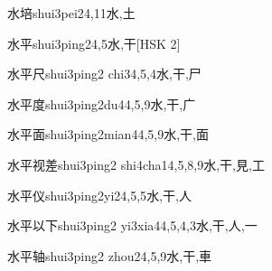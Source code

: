 \begin{EntryWithPhonetic}{水培}{shui3pei2}{4,11}{⽔,⼟}
\end{EntryWithPhonetic}

\begin{EntryWithPhonetic}{水平}{shui3ping2}{4,5}{⽔,⼲}[HSK 2]
\end{EntryWithPhonetic}

\begin{EntryWithPhonetic}{水平尺}{shui3ping2 chi3}{4,5,4}{⽔,⼲,⼫}
\end{EntryWithPhonetic}

\begin{EntryWithPhonetic}{水平度}{shui3ping2du4}{4,5,9}{⽔,⼲,⼴}
\end{EntryWithPhonetic}

\begin{EntryWithPhonetic}{水平面}{shui3ping2mian4}{4,5,9}{⽔,⼲,⾯}
\end{EntryWithPhonetic}

\begin{EntryWithPhonetic}{水平视差}{shui3ping2 shi4cha1}{4,5,8,9}{⽔,⼲,⾒,⼯}
\end{EntryWithPhonetic}

\begin{EntryWithPhonetic}{水平仪}{shui3ping2yi2}{4,5,5}{⽔,⼲,⼈}
\end{EntryWithPhonetic}

\begin{EntryWithPhonetic}{水平以下}{shui3ping2 yi3xia4}{4,5,4,3}{⽔,⼲,⼈,⼀}
\end{EntryWithPhonetic}

\begin{EntryWithPhonetic}{水平轴}{shui3ping2 zhou2}{4,5,9}{⽔,⼲,⾞}
\end{EntryWithPhonetic}

